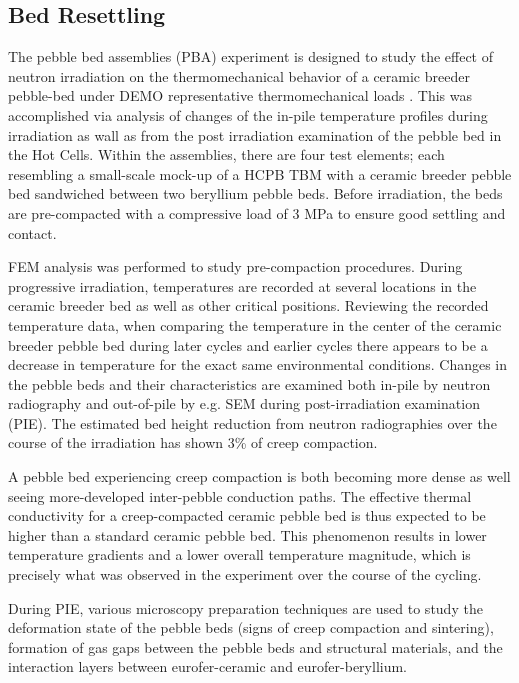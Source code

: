 \subsection{Bed Resettling}

The pebble bed assemblies (PBA) experiment is designed to study the effect of neutron irradiation on the thermomechanical behavior of a ceramic breeder pebble-bed under DEMO representative thermomechanical loads \cite{Magielsen2007}. This was accomplished via analysis of changes of the in-pile temperature profiles during irradiation as wall as from the post irradiation examination of the pebble bed in the Hot Cells. Within the assemblies, there are four test elements; each resembling a small-scale mock-up of a HCPB TBM with a ceramic breeder pebble bed sandwiched between two beryllium pebble beds. Before irradiation, the beds are pre-compacted with a compressive load of 3 MPa to ensure good settling and contact.  

FEM analysis was performed to study pre-compaction procedures.  During progressive irradiation, temperatures are recorded at several locations in the ceramic breeder bed as well as other critical positions. Reviewing the recorded temperature data, when comparing the temperature in the center of the ceramic breeder pebble bed during later cycles and earlier cycles there appears to be a decrease in temperature for the exact same environmental conditions. Changes in the pebble beds and their characteristics are examined both in-pile by neutron radiography and out-of-pile by e.g. SEM during post-irradiation examination (PIE). The estimated bed height reduction from neutron radiographies over the course of the irradiation has shown 3\% of creep compaction. 

A pebble bed experiencing creep compaction is both becoming more dense as well seeing more-developed inter-pebble conduction paths. The effective thermal conductivity for a creep-compacted ceramic pebble bed is thus expected to be higher than a standard ceramic pebble bed. This phenomenon results in lower temperature gradients and a lower overall temperature magnitude, which is precisely what was observed in the experiment over the course of the cycling. 

During PIE, various microscopy preparation techniques are used to study the deformation state of the pebble beds (signs of creep compaction and sintering), formation of gas gaps between the pebble beds and structural materials, and the interaction layers between eurofer-ceramic and eurofer-beryllium. 

